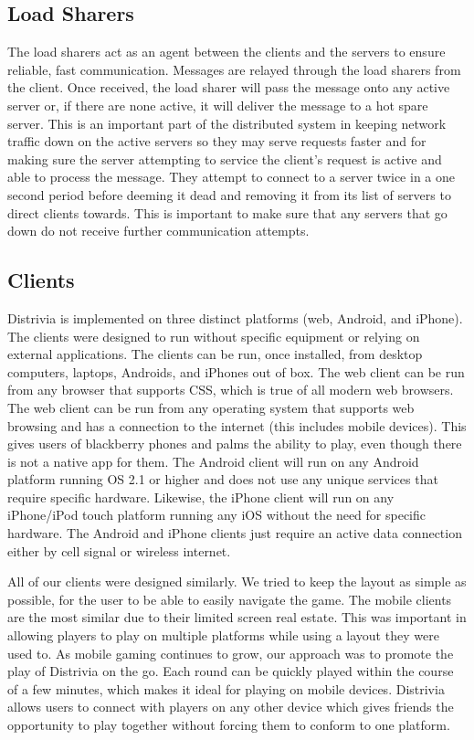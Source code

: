 \documentclass{dependencies/acm_proc_article-sp}
\begin{document}
\subsection{Load Sharers}
The load sharers act as an agent between the clients and the servers to ensure reliable, fast communication.
Messages are relayed through the load sharers from the client.
Once received, the load sharer will pass the message onto any active server or, if there are none active, it will deliver the message to a hot spare server.
This is an important part of the distributed system in keeping network traffic down on the active servers so they may serve requests faster and for making sure the server attempting to service the client's request is active and able to process the message.
They attempt to connect to a server twice in a one second period before deeming it dead and removing it from its list of servers to direct clients towards.
This is important to make sure that any servers that go down do not receive further communication attempts.


\subsection{Clients}
Distrivia is implemented on three distinct platforms (web, Android, and iPhone).
The clients were designed to run without specific equipment or relying on external applications. 
The clients can be run, once installed, from desktop computers, laptops, Androids, and iPhones out of box.
The web client can be run from any browser that supports CSS, which is true of all modern web browsers.
The web client can be run from any operating system that supports web browsing and has a connection to the internet (this includes mobile devices). 
This gives users of blackberry phones and palms the ability to play, even though there is not a native app for them.
The Android client will run on any Android platform running OS 2.1 or higher and does not use any unique services that require specific hardware.
Likewise, the iPhone client will run on any iPhone/iPod touch platform running any iOS without the need for specific hardware.
The Android and iPhone clients just require an active data connection either by cell signal or wireless internet.

All of our clients were designed similarly.
We tried to keep the layout as simple as possible, for the user to be able to easily navigate the game.
The mobile clients are the most similar due to their limited screen real estate.
This was important in allowing players to play on multiple platforms while using a layout they were used to.
As mobile gaming continues to grow, our approach was to promote the play of Distrivia on the go. 
Each round can be quickly played within the course of a few minutes, which makes it ideal for playing on mobile devices.
Distrivia allows users to connect with players on any other device which gives friends the opportunity to play together without forcing them to conform to one platform.
\end{document}
